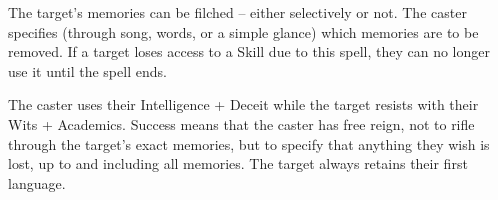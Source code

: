 \begin{multicols}{2}

The target's memories can be filched -- either selectively or not. The caster specifies (through song, words, or a simple glance) which memories are to be removed. If a target loses access to a Skill due to this spell, they can no longer use it until the spell ends.

The caster uses their Intelligence + Deceit while the target resists with their Wits + Academics.
Success means that the caster has free reign, not to rifle through the target's exact memories, but to specify that anything they wish is lost, up to and including all memories.
The target always retains their first language.

\end{multicols}


